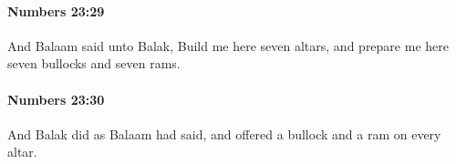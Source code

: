 		\paragraph{Numbers 23:29} %
			\label{NUMBERS-23-29}

			And Balaam said unto Balak, Build me here seven altars, and prepare me here seven bullocks and seven rams.


		\paragraph{Numbers 23:30} %
			\label{NUMBERS-23-30}

			And Balak did as Balaam had said, and offered a bullock and a ram on every altar.


